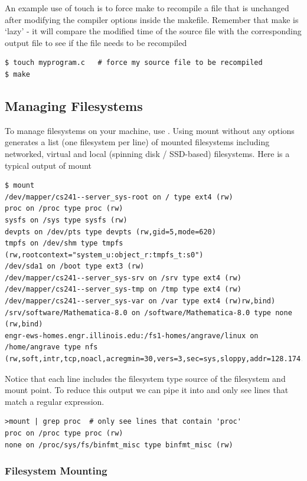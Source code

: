 An example use of touch is to force make to recompile a file that is unchanged after modifying the compiler options inside the makefile. Remember that make is `lazy' - it will compare the modified time of the source file with the corresponding output file to see if the file needs to be recompiled

\begin{verbatim}
$ touch myprogram.c   # force my source file to be recompiled
$ make
\end{verbatim}

\subsection{Managing Filesystems}

To manage filesystems on your machine, use . Using mount without any options generates a list (one filesystem per line) of mounted filesystems including networked, virtual and local (spinning disk / SSD-based) filesystems. Here is a typical output of mount

\begin{verbatim}
$ mount
/dev/mapper/cs241--server_sys-root on / type ext4 (rw)
proc on /proc type proc (rw)
sysfs on /sys type sysfs (rw)
devpts on /dev/pts type devpts (rw,gid=5,mode=620)
tmpfs on /dev/shm type tmpfs (rw,rootcontext="system_u:object_r:tmpfs_t:s0")
/dev/sda1 on /boot type ext3 (rw)
/dev/mapper/cs241--server_sys-srv on /srv type ext4 (rw)
/dev/mapper/cs241--server_sys-tmp on /tmp type ext4 (rw)
/dev/mapper/cs241--server_sys-var on /var type ext4 (rw)rw,bind)
/srv/software/Mathematica-8.0 on /software/Mathematica-8.0 type none (rw,bind)
engr-ews-homes.engr.illinois.edu:/fs1-homes/angrave/linux on /home/angrave type nfs (rw,soft,intr,tcp,noacl,acregmin=30,vers=3,sec=sys,sloppy,addr=128.174.252.102)
\end{verbatim}

Notice that each line includes the filesystem type source of the filesystem and mount point. To reduce this output we can pipe it into  and only see lines that match a regular expression.

\begin{verbatim}
>mount | grep proc  # only see lines that contain 'proc'
proc on /proc type proc (rw)
none on /proc/sys/fs/binfmt_misc type binfmt_misc (rw)
\end{verbatim}

\subsubsection{Filesystem Mounting}

